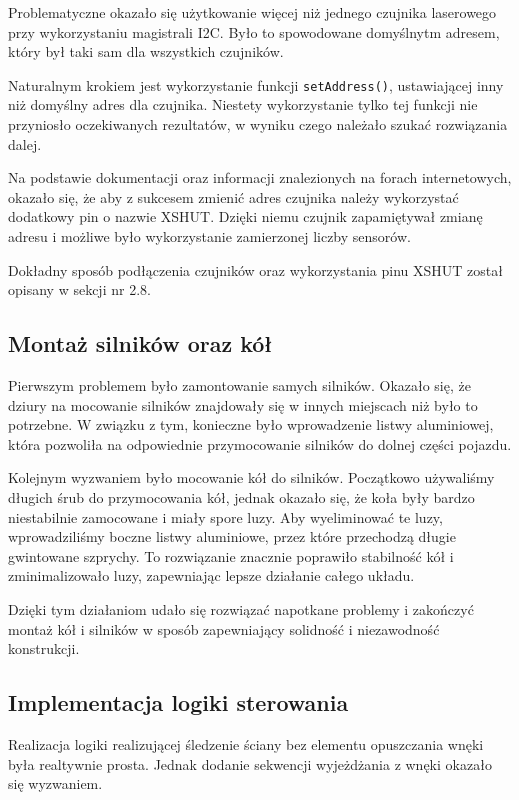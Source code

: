 \documentclass{report}
\begin{document}
Problematyczne okazało się użytkowanie więcej niż jednego czujnika laserowego przy wykorzystaniu magistrali I2C. Było to spowodowane domyślnytm adresem, który był taki sam dla wszystkich czujników. 

Naturalnym krokiem jest wykorzystanie funkcji \texttt{setAddress()}, ustawiającej inny niż domyślny adres dla czujnika. Niestety wykorzystanie tylko tej funkcji nie przyniosło oczekiwanych rezultatów, w wyniku czego należało szukać rozwiązania dalej. 

Na podstawie dokumentacji oraz informacji znalezionych na forach internetowych, okazało się, że aby z sukcesem zmienić adres czujnika należy wykorzystać dodatkowy pin o nazwie XSHUT. Dzięki niemu czujnik zapamiętywał zmianę adresu i możliwe było wykorzystanie zamierzonej liczby sensorów. 

Dokładny sposób podłączenia czujników oraz wykorzystania pinu XSHUT został opisany w sekcji nr 2.8.

\subsection{\Large Montaż silników oraz kół}
%
%
Pierwszym problemem było zamontowanie samych silników. Okazało się, że dziury na mocowanie silników znajdowały się w innych miejscach niż było to potrzebne. W związku z tym, konieczne było wprowadzenie listwy aluminiowej, która pozwoliła na odpowiednie przymocowanie silników do dolnej części pojazdu.

Kolejnym wyzwaniem było mocowanie kół do silników. Początkowo używaliśmy długich śrub do przymocowania kół, jednak okazało się, że koła były bardzo niestabilnie zamocowane i miały spore luzy. Aby wyeliminować te luzy, wprowadziliśmy boczne listwy aluminiowe, przez które przechodzą długie gwintowane szprychy. To rozwiązanie znacznie poprawiło stabilność kół i zminimalizowało luzy, zapewniając lepsze działanie całego układu.

Dzięki tym działaniom udało się rozwiązać napotkane problemy i zakończyć montaż kół i silników w sposób zapewniający solidność i niezawodność konstrukcji.

\subsection{\Large Implementacja logiki sterowania}
Realizacja logiki realizującej śledzenie ściany bez elementu opuszczania wnęki była realtywnie prosta. Jednak dodanie sekwencji wyjeżdżania z wnęki okazało się wyzwaniem.
\end{document}
